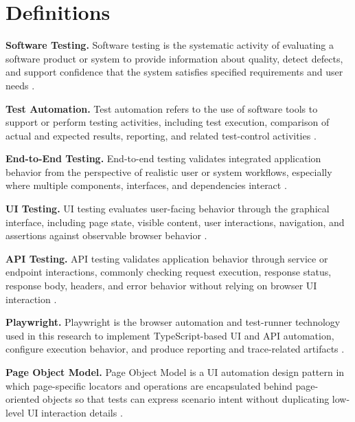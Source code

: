 \chapter*{Definitions}

\begin{sloppypar}
\noindent\textbf{Software Testing.} Software testing is the systematic activity of evaluating a software product or system to provide information about quality, detect defects, and support confidence that the system satisfies specified requirements and user needs \autocite{istqb_ctfl_syllabus_2024,ammann_offutt_testing_2016}.

\noindent\textbf{Test Automation.} Test automation refers to the use of software tools to support or perform testing activities, including test execution, comparison of actual and expected results, reporting, and related test-control activities \autocite{istqb_glossary_test_automation_2026,garousi_mantyla_automation_2016}.

\noindent\textbf{End-to-End Testing.} End-to-end testing validates integrated application behavior from the perspective of realistic user or system workflows, especially where multiple components, interfaces, and dependencies interact \autocite{leotta_e2e_web_testing_2016}.

\noindent\textbf{UI Testing.} UI testing evaluates user-facing behavior through the graphical interface, including page state, visible content, user interactions, navigation, and assertions against observable browser behavior \autocite{playwright_docs_locators_2026,playwright_docs_assertions_2026}.

\noindent\textbf{API Testing.} API testing validates application behavior through service or endpoint interactions, commonly checking request execution, response status, response body, headers, and error behavior without relying on browser UI interaction \autocite{playwright_docs_api_testing_2026,playwright_docs_apirequestcontext_2026}.

\noindent\textbf{Playwright.} Playwright is the browser automation and test-runner technology used in this research to implement TypeScript-based UI and API automation, configure execution behavior, and produce reporting and trace-related artifacts \autocite{playwright_docs_intro_2026,playwright_docs_configuration_2026}.

\noindent\textbf{Page Object Model.} Page Object Model is a UI automation design pattern in which page-specific locators and operations are encapsulated behind page-oriented objects so that tests can express scenario intent without duplicating low-level UI interaction details \autocite{fowler_page_object_2013,playwright_docs_pom_2026,selenium_page_object_models_2026}.


\end{sloppypar}

